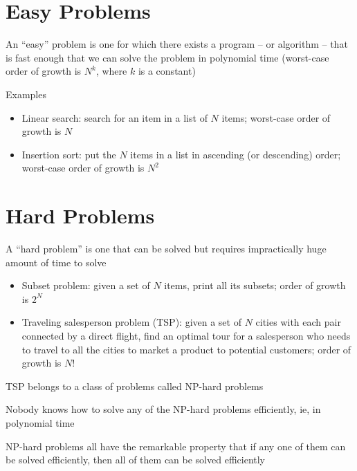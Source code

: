 \documentclass[8pt,a4paper,compress]{beamer}
\begin{document}
\section{Easy Problems}
\begin{frame}[fragile]
\pause

An ``easy'' problem is one for which there exists a program -- or algorithm -- that is fast enough that we can solve the problem in polynomial time (worst-case order of growth is $N^k$, where $k$ is a constant)

\pause
\bigskip

Examples
\begin{itemize}
\item Linear search: search for an item in a list of $N$ items; worst-case order of growth is $N$

\item Insertion sort: put the $N$ items in a list in ascending (or descending) order; worst-case order of growth is $N^2$
\end{itemize}
\end{frame}

\section{Hard Problems}
\begin{frame}[fragile]
\pause

A ``hard problem'' is one that can be solved but requires impractically huge amount of time to solve

\pause
\bigskip

\begin{itemize}
\item Subset problem: given a set of $N$ items, print all its subsets; order of growth is $2^N$

\item Traveling salesperson problem (TSP): given a set of $N$ cities with each pair connected by a direct flight, find an optimal tour for a salesperson who needs to travel to all the cities to market a product to potential customers; order of growth is $N!$
\end{itemize}

\pause
\bigskip

TSP belongs to a class of problems called NP-hard problems

\pause
\bigskip

Nobody knows how to solve any of the NP-hard problems efficiently, ie, in polynomial time

\pause
\bigskip

NP-hard problems all have the remarkable property that if any one of them can be solved efficiently, then all of them can be solved efficiently
\end{frame}
\end{document}
